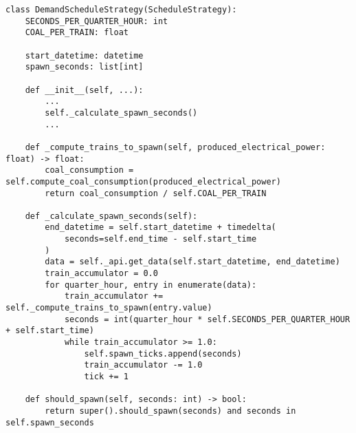 \lstset{language=python}
\begin{lstlisting}[caption={Quelltextunterschrift}, label=code:template-method-code]
class DemandScheduleStrategy(ScheduleStrategy):
    SECONDS_PER_QUARTER_HOUR: int
    COAL_PER_TRAIN: float

    start_datetime: datetime
    spawn_seconds: list[int]

    def __init__(self, ...):
        ...
        self._calculate_spawn_seconds()
        ...

    def _compute_trains_to_spawn(self, produced_electrical_power: float) -> float:
        coal_consumption = self.compute_coal_consumption(produced_electrical_power)
        return coal_consumption / self.COAL_PER_TRAIN

    def _calculate_spawn_seconds(self):
        end_datetime = self.start_datetime + timedelta(
            seconds=self.end_time - self.start_time
        )
        data = self._api.get_data(self.start_datetime, end_datetime)
        train_accumulator = 0.0
        for quarter_hour, entry in enumerate(data):
            train_accumulator += self._compute_trains_to_spawn(entry.value)
            seconds = int(quarter_hour * self.SECONDS_PER_QUARTER_HOUR + self.start_time)
            while train_accumulator >= 1.0:
                self.spawn_ticks.append(seconds)
                train_accumulator -= 1.0
                tick += 1

	def should_spawn(self, seconds: int) -> bool:
    	return super().should_spawn(seconds) and seconds in self.spawn_seconds
\end{lstlisting}
